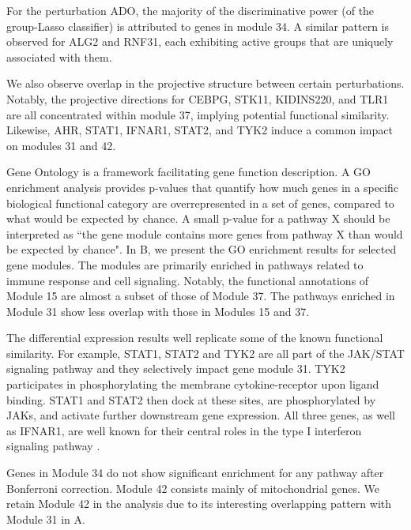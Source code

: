 \documentclass[11pt]{article}
\newenvironment{revblock}
  {\color{teal}}
  {}
\begin{document}
For the perturbation ADO, the majority of the discriminative power (of the group-Lasso classifier) is attributed to genes in module 34. A similar pattern is observed for ALG2 and RNF31, each exhibiting active groups that are uniquely associated with them.

We also observe overlap in the projective structure between certain perturbations. Notably, the projective directions for CEBPG, STK11, KIDINS220, and TLR1 are all concentrated within module 37, implying potential functional similarity. Likewise, AHR, STAT1, IFNAR1, STAT2, and TYK2 induce a common impact on modules 31 and 42.

\begin{revblock}
Gene Ontology is a framework facilitating gene function description. A GO enrichment analysis provides p-values that quantify how much genes in a specific biological functional category are overrepresented in a set of genes, compared to what would be expected by chance. A small p-value for a pathway X should be interpreted as ``the gene module contains more genes from pathway X than would be expected by chance". In B, we present the GO enrichment results for selected gene modules. The modules are primarily enriched in pathways related to immune response and cell signaling. Notably, the functional annotations of Module 15 are almost a subset of those of Module 37. The pathways enriched in Module 31 show less overlap with those in Modules 15 and 37. 

The differential expression results well replicate some of the known functional similarity. For example, STAT1, STAT2 and TYK2 are all part of the JAK/STAT signaling pathway \citep{rawlings2004jak, hu2021jak} and they selectively impact gene module 31. TYK2 participates in phosphorylating the membrane cytokine-receptor upon ligand binding. STAT1 and STAT2 then dock at these sites, are phosphorylated by JAKs, and activate further downstream gene expression. All three genes, as well as IFNAR1, are well known for their central roles in the type I interferon signaling pathway \citep{velazquez1992protein,qureshi1995tyrosine,prchal2012tyk2}.

Genes in Module 34 do not show significant enrichment for any pathway after Bonferroni correction. Module 42 consists mainly of mitochondrial genes. We retain Module 42 in the analysis due to its interesting overlapping pattern with Module 31 in A.
\end{revblock}
\end{document}
